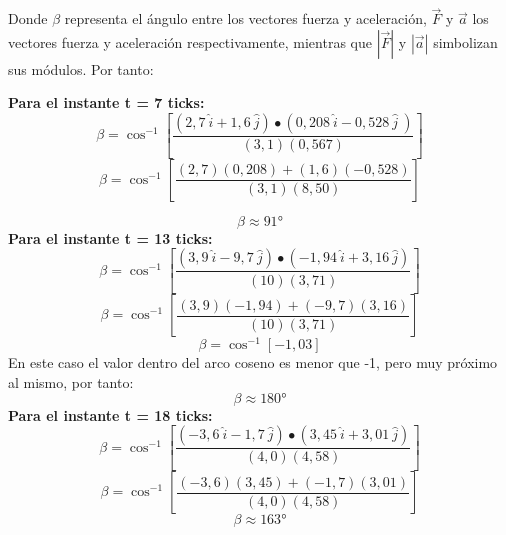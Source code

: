 \documentclass[../main.tex]{subfiles}
\begin{document}
Donde $\beta$ representa el ángulo entre los vectores fuerza y aceleración, $\vec{F}$ y $\vec{a}$ los vectores
fuerza y aceleración respectivamente, mientras que $\left|\vec{F}\right|$ y $\left|\vec{a}\right|$ simbolizan 
sus módulos. Por tanto:

\textbf{Para el instante t = 7 ticks:}
\[\beta=\cos^{-1}{\left[\frac{\left(2,7\ \hat{i}+1,6\ \hat{j}\right)\bullet\left(0,208\ \hat{i}-0,528\ \hat{j}\ \right)}{\left(3,1\right)\left(0,567\right)}\right]}\]
\[\beta=\cos^{-1}{\left[\frac{\left(2,7\right)\left(0,208\right)+\left(1,6\right)\left(-0,528\right)}{\left(3,1\right)\left(8,50\right)}\right]}\]

\[\beta\approx91°\]
\textbf{Para el instante t = 13 ticks:}
\[\beta=\cos^{-1}{\left[\frac{\left(3,9\ \hat{i}-9,7\ \hat{j}\right)\bullet\left(-1,94\ \hat{i}+3,16\ \hat{j}\right)}{\left(10\right)\left(3,71\right)}\right]}\]
\[\beta=\cos^{-1}{\left[\frac{\left(3,9\right)\left(-1,94\right)+\left(-9,7\right)\left(3,16\right)}{\left(10\right)\left(3,71\right)}\right]}\]
\[\beta=\cos^{-1}{\left[-1,03\right]}\]
En este caso el valor dentro del arco coseno es menor que -1, pero muy próximo al mismo, por tanto:
\[\beta\approx180°\]
\textbf{Para el instante t = 18 ticks:}
\[\beta=\cos^{-1}{\left[\frac{\left(-3,6\ \hat{i}-1,7\ \hat{j}\right)\bullet\left(3,45\ \hat{i}+3,01\ \hat{j}\right)}{\left(4,0\right)\left(4,58\right)}\right]}\]
\[\beta=\cos^{-1}{\left[\frac{\left(-3,6\right)\left(3,45\right)+\left(-1,7\right)\left(3,01\right)}{\left(4,0\right)\left(4,58\right)}\right]}\]
\[\beta\approx163°\]


\end{document}
